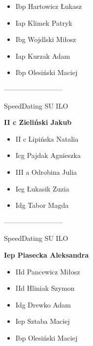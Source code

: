 \documentclass[a4paper,10pt]{article}
\begin{document}
\begin{multicols}{3}
\begin{minipage}[l]{\textwidth}
  \begin{itemize}
    \item Ibp Hartowicz Łukasz
    \item Iap Klimek Patryk
    \item Ibg Wojdlski Miłosz
    \item Iap Kurzak Adam
    \item Ibp Olesiński Maciej

    \end{itemize}



\end{minipage}



\begin{minipage}[l]{\textwidth}
--------------------------

  \footnotesize{SpeedDating SU ILO}

  \bfseries{II c Zieliński Jakub}

  \begin{itemize}
    \item II c Lipińska Natalia
    \item Icg Pajdak Agnieszka
    \item III a Odrobina Julia
    \item Ieg Łukasik Zuzia
    \item Idg Tabor Magda

    \end{itemize}



\end{minipage}



\begin{minipage}[l]{\textwidth}
--------------------------

  \footnotesize{SpeedDating SU ILO}

  \bfseries{Iep Piasecka Aleksandra}

  \begin{itemize}
    \item IId Pancewicz Miłosz
    \item IId Hliniak Szymon
    \item Idg Drewko Adam
    \item Iep Sztaba Maciej
    \item Ibp Olesiński Maciej

    \end{itemize}




\end{minipage}
\end{multicols}
\end{document}
